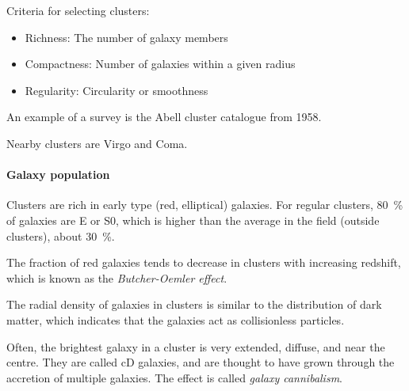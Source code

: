 Criteria for selecting clusters:
\begin{itemize}
	\item Richness: The number of galaxy members
	\item Compactness: Number of galaxies within a given radius
	\item Regularity: Circularity or smoothness
\end{itemize}

An example of a survey is the Abell cluster catalogue from 1958.

Nearby clusters are Virgo and Coma.

\paragraph*{Galaxy population}
Clusters are rich in early type (red, elliptical) galaxies.
For regular clusters, \SI{80}{\percent} of galaxies are E or S0, which is higher than the average in the field (outside clusters), about \SI{30}{\percent}.

The fraction of red galaxies tends to decrease in clusters with increasing redshift, which is known as the \emph{Butcher-Oemler effect}.

The radial density of galaxies in clusters is similar to the distribution of dark matter, which indicates that the galaxies act as collisionless particles.

Often, the brightest galaxy in a cluster is very extended, diffuse, and near the centre. They are called cD galaxies, and are thought to have grown through the accretion of multiple galaxies.
The effect is called \emph{galaxy cannibalism}.

